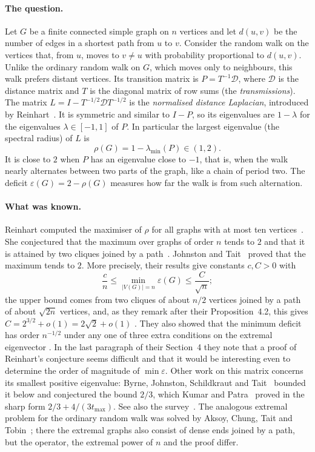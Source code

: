 \documentclass[11pt,a4paper]{article}
\theoremstyle{definition}
\newcommand{\eps}{\varepsilon}
\begin{document}
\paragraph{The question.}
Let $G$ be a finite connected simple graph on $n$ vertices and let $d(u,v)$ be the number of edges in a shortest path from $u$ to $v$. Consider the random walk on the vertices that, from $u$, moves to $v\ne u$ with probability proportional to $d(u,v)$. Unlike the ordinary random walk on $G$, which moves only to neighbours, this walk prefers distant vertices. Its transition matrix is $P=T^{-1}\mathcal D$, where $\mathcal D$ is the distance matrix and $T$ is the diagonal matrix of row sums (the \emph{transmissions}). The matrix $L=I-T^{-1/2}\mathcal DT^{-1/2}$ is the \emph{normalised distance Laplacian}, introduced by Reinhart~\cite{reinhart}. It is symmetric and similar to $I-P$, so its eigenvalues are $1-\lambda$ for the eigenvalues $\lambda\in[-1,1]$ of $P$. In particular the largest eigenvalue (the spectral radius) of $L$ is
\[
\rho(G)=1-\lambda_{\min}(P)\in(1,2).
\]
It is close to $2$ when $P$ has an eigenvalue close to $-1$, that is, when the walk nearly alternates between two parts of the graph, like a chain of period two. The deficit $\eps(G)=2-\rho(G)$ measures how far the walk is from such alternation.

\paragraph{What was known.}
Reinhart computed the maximiser of $\rho$ for all graphs with at most ten vertices~\cite[Table~2.1]{reinhart}. She conjectured that the maximum over graphs of order $n$ tends to $2$ and that it is attained by two cliques joined by a path~\cite[Conjecture~2.10]{reinhart}. Johnston and Tait~\cite{jt} proved that the maximum tends to $2$. More precisely, their results give constants $c,C>0$ with
\[
 \frac cn\le\min_{|V(G)|=n}\eps(G)\le\frac C{\sqrt n};
\]
the upper bound comes from two cliques of about $n/2$ vertices joined by a path of about $\sqrt{2n}$ vertices, and, as they remark after their Proposition~4.2, this gives $C=2^{3/2}+o(1)=2\sqrt2+o(1)$ \cite{jt}. They also showed that the minimum deficit has order $n^{-1/2}$ under any one of three extra conditions on the extremal eigenvector \cite[Theorem~4.7]{jt}. In the last paragraph of their Section~4 they note that a proof of Reinhart's conjecture seems difficult and that it would be interesting even to determine the order of magnitude of $\min\eps$. Other work on this matrix concerns its smallest positive eigenvalue: Byrne, Johnston, Schildkraut and Tait~\cite{bjst} bounded it below and conjectured the bound $2/3$, which Kumar and Patra~\cite{kp} proved in the sharp form $2/3+4/(3t_{\max})$. See also the survey~\cite{hr}. The analogous extremal problem for the ordinary random walk was solved by Aksoy, Chung, Tait and Tobin~\cite{aksoy}; there the extremal graphs also consist of dense ends joined by a path, but the operator, the extremal power of $n$ and the proof differ.
\end{document}
